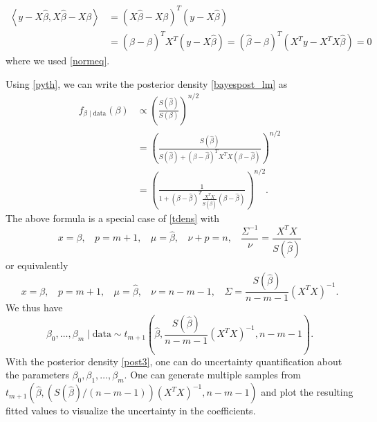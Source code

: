 \documentclass{scrartcl}
\begin{document}
\begin{enumerate}
  \begin{align*}
     \left<y - X \hat{\beta}, X \hat{\beta} - X \beta \right> &=
                                                                \left(X
                                                                \hat{\beta}
                                                                - X \beta
                                                                \right)^T
                                                                \left(y
                                                                - X
                                                                \hat{\beta}
                                                                \right)
    \\
    &= \left( \hat{\beta} - \beta \right)^T X^T (y - X \hat{\beta}) =
      \left( \hat{\beta} - \beta \right)^T \left(X^T y - X^T X
      \hat{\beta} \right) = 0
  \end{align*}
  where we used \eqref{normeq}. 
\end{enumerate}
Using \eqref{pyth}, we can write the posterior density
\eqref{bayespost_lm} as
\begin{align}
  f_{\beta \mid \text{data}}(\beta) &\propto \left(
                                      \frac{S(\hat{\beta})}{S(\beta)}
                                      \right)^{n/2} \nonumber \\
  &= \left(\frac{S(\hat{\beta})}{S(\hat{\beta}) + \left(\beta -
    \hat{\beta} \right)^T X^T X \left(\beta - \hat{\beta} \right)}
    \right)^{n/2} \nonumber \\ &= \left(\frac{1}{1 + \left(\beta -
    \hat{\beta} \right)^T \frac{X^T X}{S(\hat{\beta})} \left(\beta - \hat{\beta} \right)}
    \right)^{n/2}.  \label{post2}
\end{align}
The above formula is a special case of \eqref{tdens} with
\begin{equation*}
x = \beta, ~~~~  p = m+1, ~~~~ \mu = \hat{\beta}, ~~~~ \nu + p = n, ~~~~
\frac{\Sigma^{-1}}{\nu} = \frac{X^T X}{S(\hat{\beta})}
\end{equation*}
or equivalently
\begin{equation*}
  x = \beta, ~~~~  p = m+1, ~~~~ \mu = \hat{\beta}, ~~~~ \nu = n - m -
  1, ~~~~ \Sigma = \frac{S(\hat{\beta})}{n - m - 1} \left(X^T X
  \right)^{-1}. 
\end{equation*}
We thus have
\begin{equation}\label{post3}
  \beta_0, \dots, \beta_m \mid \text{data} \sim
  t_{m+1}\left(\hat{\beta},\frac{S(\hat{\beta})}{n - m - 1} \left(X^T
      X 
  \right)^{-1}, n - m - 1 \right). 
\end{equation}
With the posterior density \eqref{post3}, one can do uncertainty
quantification 
about the parameters $\beta_0, \beta_1, \dots, \beta_m$. One can generate
multiple samples from $t_{m+1}(\hat{\beta}, (S(\hat{\beta})/(n-m-1))
  (X^T X)^{-1}, n-m-1)$ and plot the resulting fitted values to visualize the
  uncertainty in the coefficients.
\end{document}
